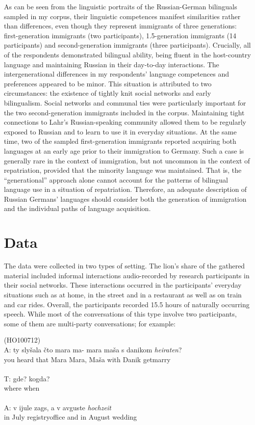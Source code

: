 As can be seen from the linguistic portraits of the  Russian-German bilinguals sampled in my corpus, their linguistic competences manifest similarities rather than differences, even though they represent immigrants of three generations: first-generation immigrants (two participants), 1.5-generation immigrants (14 participants) and  second-generation immigrants (three participants). Crucially, all of the respondents demonstrated bilingual ability, being fluent in the host-country language and maintaining Russian in their day-to-day interactions. The intergenerational differences in my respondents' language competences and preferences appeared to be minor. This situation is attributed to two circumstances: the existence of tightly knit social networks and early bilingualism. Social networks and communal ties were particularly important for the two second-generation immigrants included in the corpus. Maintaining tight connections to Lahr's Russian-speaking community allowed them to be regularly exposed to Russian and to learn to use it in everyday situations. At the same time, two of the sampled first-generation immigrants reported acquiring both languages at an early age prior to their immigration to Germany. Such a case is generally rare in the context of immigration, but not uncommon in the context of repatriation, provided that the minority language was maintained. That is, the “generational” approach alone cannot account for the patterns of bilingual language use in a situation of repatriation. Therefore, an adequate description of Russian Germans' languages should consider both the generation of immigration and the individual paths of language acquisition.

\section{Data}

The data were collected in two types of setting. The lion's share of the gathered material included informal interactions audio-recorded by research participants in their social networks. These interactions occurred in the participants' everyday situations such as at home, in the street and in a restaurant as well as on train and car rides. Overall, the participants recorded 15.5 hours of naturally occurring speech. While most of the conversations of this type involve two participants, some of them are multi-party conversations; for example: 

\ea
\label{ex:3:1}
(HO100712)\\
 \gll A: ty slyšala čto mara ma- mara maša s danikom \textit{heiraten}?\\
	{} you heard that Mara {} Mara, Maša with Danik {get\textunderscore{}marry}\\ 
\glt \hfill \\ 
 \gll T: gde? kogda?\\
	{} where when\\
	\glt \hfill \\
\gll A: v ijule zags, a v avguste \textit{hochzeit} \\
	{}  in July {registry\textunderscore{}office} and in August wedding\\
\glt \hfill \\

